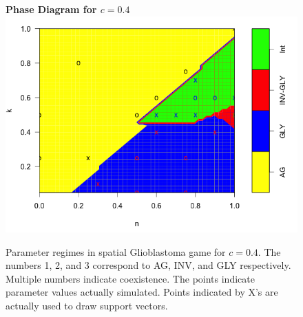 \documentclass[12pt]{report}
\newcommand{\comment}[1]{}
\begin{document}
\begin{figure}[H]
\centering
\textbf{Phase Diagram for $c = 0.4$}
\includegraphics[width = 0.9 \linewidth]{Diagrams/b2_phase}
\caption{Parameter regimes in spatial Glioblastoma game for $c = 0.4$. The numbers 1, 2, and 3 correspond to AG, INV, and GLY respectively. Multiple numbers indicate coexistence. The points indicate parameter values actually simulated. Points indicated by X's are actually used to draw support vectors.}
\end{figure}

\comment{

  n   c   k    Type.1    Type.2    Type.3 Clustering Coexistence              p.AG             p.INV
11 0.8 0.4 0.5 0.3663384 0.2658916 0.3677701  0.4428415         123          0.609375             0.375
14 0.8 0.4 0.6 0.3462092 0.2706702 0.3831206  0.4238495         123           0.78125              0.25
16 1.0 0.4 0.6 0.1768036 0.3836824 0.4395141  0.4638422         123              0.58               0.4
17 0.9 0.4 0.6 0.2731686 0.3058015 0.4210299  0.4534332         123 0.666666666666667 0.333333333333333
18 0.7 0.4 0.5 0.3107959 0.2886210 0.4005831  0.4348977         123  0.73469387755102 0.285714285714286
20 0.8 0.4 0.7 0.4486566 0.2226489 0.3286945  0.4266801         123          0.953125             0.125
23 0.6 0.4 0.5 0.

           d1           d2        d3
11 -0.2430366 -0.109108400 0.3521451
14 -0.4350408  0.020670200 0.4143706
16 -0.4031964 -0.016317600 0.4195141
17 -0.3934981 -0.027531833 0.4210299
18 -0.4238980  0.002906714 0.4209913
20 -0.5044684  0.097648900 0.4068195
23 -0.6157197  0.021820433 0.5938992
}
\end{document}
